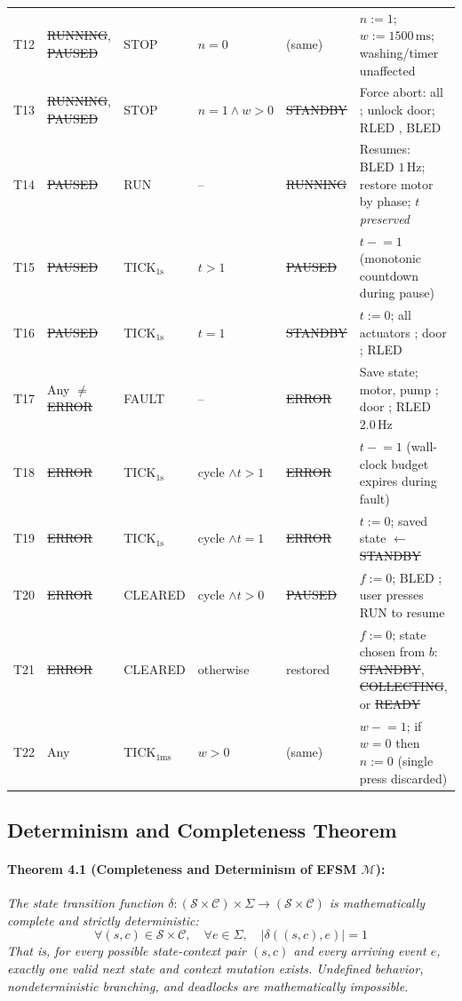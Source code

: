 \begin{longtable}{L{0.8cm}L{2.7cm}L{1.9cm}L{2.5cm}L{2.3cm}L{4.1cm}}
  T12 & \st{RUNNING}, \st{PAUSED} & STOP & $n = 0$ & (same) & $n := 1$; $w := 1500\,\text{ms}$; washing/timer unaffected \\
  T13 & \st{RUNNING}, \st{PAUSED} & STOP & $n = 1 \land w > 0$ & \st{STANDBY} & Force abort: all ; unlock door; RLED , BLED  \\
  T14 & \st{PAUSED}     & RUN       & -- & \st{RUNNING}    & Resumes: BLED $1\,\text{Hz}$; restore motor by phase; $t$ \emph{preserved} \\
  T15 & \st{PAUSED}     & TICK$_{1\text{s}}$ & $t > 1$ & \st{PAUSED}     & $t \mathrel{-}= 1$ (monotonic countdown during pause) \\
  T16 & \st{PAUSED}     & TICK$_{1\text{s}}$ & $t = 1$ & \st{STANDBY} & $t := 0$; all actuators ; door ; RLED  \\
  T17 & Any $\neq$ \st{ERROR} & FAULT & -- & \st{ERROR} & Save state; motor, pump ; door ; RLED $2.0\,\text{Hz}$ \\
  T18 & \st{ERROR}      & TICK$_{1\text{s}}$ & cycle $\land t > 1$ & \st{ERROR} & $t \mathrel{-}= 1$ (wall-clock budget expires during fault) \\
  T19 & \st{ERROR}      & TICK$_{1\text{s}}$ & cycle $\land t = 1$ & \st{ERROR} & $t := 0$; saved state $\gets$ \st{STANDBY} \\
  T20 & \st{ERROR}      & CLEARED   & cycle $\land t > 0$ & \st{PAUSED} & $f := 0$; BLED ; user presses RUN to resume \\
  T21 & \st{ERROR}      & CLEARED   & otherwise & restored & $f := 0$; state chosen from $b$: \st{STANDBY}, \st{COLLECTING}, or \st{READY} \\
  T22 & Any             & TICK$_{1\text{ms}}$ & $w > 0$ & (same) & $w \mathrel{-}= 1$; if $w = 0$ then $n := 0$ (single press discarded) \\
\end{longtable}
\endgroup

\subsection{Determinism and Completeness Theorem}
\label{sec:determinism-proof}

\paragraph{Theorem 4.1 (Completeness and Determinism of EFSM $\mathcal{M}$):}
\textit{The state transition function $\delta: (\mathcal{S} \times \mathcal{C}) \times \Sigma \to (\mathcal{S} \times \mathcal{C})$
is mathematically complete and strictly deterministic:
\begin{equation}
  \forall (s, c) \in \mathcal{S} \times \mathcal{C}, \quad \forall e \in \Sigma, \quad \big| \delta((s, c), e) \big| = 1
\end{equation}
That is, for every possible state-context pair $(s, c)$ and every arriving event $e$, exactly one
valid next state and context mutation exists. Undefined behavior, nondeterministic branching, and
deadlocks are mathematically impossible.}

